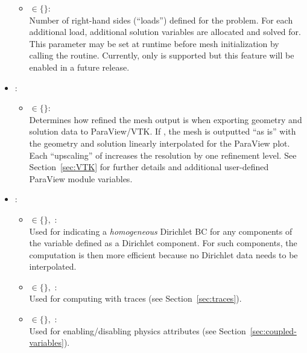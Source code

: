 \begin{itemize}
{\begin{itemize}
			\item {} $\in \{$$\}$:\\
			Number of right-hand sides (``loads'') defined for the problem. For each additional load, additional solution variables are allocated and solved for. This parameter may be set at runtime before mesh initialization by calling the  routine. Currently, only  is supported but this feature will be enabled in a future release.
		\end{itemize}
	}
	\item
	{
		 : 
		\begin{itemize}
			\item { $\in \{$$\}$:\\
			Determines how refined the mesh output is when exporting geometry and solution data to ParaView/VTK. If , the mesh is outputted ``as is'' with the geometry and solution linearly interpolated for the ParaView plot. Each ``upscaling'' of  increases the resolution by one refinement level. See Section~\ref{sec:VTK} for further details and additional user-defined ParaView module variables.
			}
		\end{itemize}
	}
	\item
	{
		 :
		\begin{itemize}
			\item{  $\in \{$$\},$ :\\
			Used for indicating a \emph{homogeneous} Dirichlet BC for any components of the variable defined as a Dirichlet component. For such components, the computation is then more efficient because no Dirichlet data needs to be interpolated.
			}
			\item{  $\in \{$$\},$ :\\ 
			Used for computing with traces (see Section~\ref{sec:traces}).
			}
			\item{  $\in \{$$\},$ :\\ 
			Used for enabling/disabling physics attributes (see Section~\ref{sec:coupled-variables}).
			}
		\end{itemize}
	}
\end{itemize}

